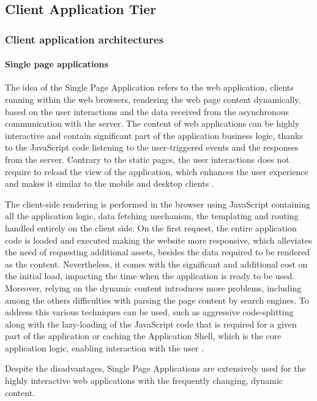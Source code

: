 \subsection{Client Application Tier}

\subsubsection{Client application architectures}

\paragraph*{Single page applications}

The idea of the Single Page Application refers to the web application, clients running within the web browsers, rendering the web page content dynamically, based on the user interactions and the data received from the asynchronous communication with the server. The content of web applications can be highly interactive and contain significant part of the application business logic, thanks to the JavaScript code listening to the user-triggered events and the responses from the server.
Contrary to the static pages, the user interactions does not require to reload the view of the application, which enhances the user experience and makes it similar to the mobile and desktop clients \cite{PerspectivesOnArchitectureEvolution}.

The client-side rendering is performed in the browser using JavaScript containing all the application logic, data fetching mechanism, the templating and routing handled entirely on the client side. On the first request, the entire application code is loaded and executed making the website more responsive, which alleviates the need of requesting additional assets, besides the data required to be rendered as the content. Nevertheless, it comes with the significant and additional cost on the initial load, impacting the time when the application is ready to be used. Moreover, relying on the dynamic content introduces more problems, including among the others difficulties with parsing the page content by search engines. To address this various techniques can be used, such as aggressive code-splitting along with the lazy-loading of the JavaScript code that is required for a given part of the application or caching the Application Shell, which is the core application logic, enabling interaction with the user \cite{GoogleRenderingOnTheWeb}.

Despite the disadvantages, Single Page Applications are extensively used for the highly interactive web applications with the frequently changing, dynamic content.

